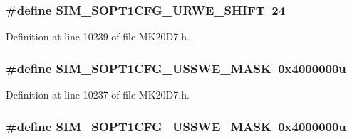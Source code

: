 \subsubsection[{\texorpdfstring{S\+I\+M\+\_\+\+S\+O\+P\+T1\+C\+F\+G\+\_\+\+U\+R\+W\+E\+\_\+\+S\+H\+I\+FT}{SIM_SOPT1CFG_URWE_SHIFT}}]{\setlength{\rightskip}{0pt plus 5cm}\#define S\+I\+M\+\_\+\+S\+O\+P\+T1\+C\+F\+G\+\_\+\+U\+R\+W\+E\+\_\+\+S\+H\+I\+FT~24}\hypertarget{group___s_i_m___register___masks_ga07bf2ffc61aacca96748747fa8df7062}{}\label{group___s_i_m___register___masks_ga07bf2ffc61aacca96748747fa8df7062}


Definition at line 10239 of file M\+K20\+D7.\+h.

\subsubsection[{\texorpdfstring{S\+I\+M\+\_\+\+S\+O\+P\+T1\+C\+F\+G\+\_\+\+U\+S\+S\+W\+E\+\_\+\+M\+A\+SK}{SIM_SOPT1CFG_USSWE_MASK}}]{\setlength{\rightskip}{0pt plus 5cm}\#define S\+I\+M\+\_\+\+S\+O\+P\+T1\+C\+F\+G\+\_\+\+U\+S\+S\+W\+E\+\_\+\+M\+A\+SK~0x4000000u}\hypertarget{group___s_i_m___register___masks_ga0b7d9fe471d5d689ba3feb001cf69b60}{}\label{group___s_i_m___register___masks_ga0b7d9fe471d5d689ba3feb001cf69b60}


Definition at line 10237 of file M\+K20\+D7.\+h.

\subsubsection[{\texorpdfstring{S\+I\+M\+\_\+\+S\+O\+P\+T1\+C\+F\+G\+\_\+\+U\+S\+S\+W\+E\+\_\+\+M\+A\+SK}{SIM_SOPT1CFG_USSWE_MASK}}]{\setlength{\rightskip}{0pt plus 5cm}\#define S\+I\+M\+\_\+\+S\+O\+P\+T1\+C\+F\+G\+\_\+\+U\+S\+S\+W\+E\+\_\+\+M\+A\+SK~0x4000000u}\hypertarget{group___s_i_m___register___masks_ga0b7d9fe471d5d689ba3feb001cf69b60}{}\label{group___s_i_m___register___masks_ga0b7d9fe471d5d689ba3feb001cf69b60}


